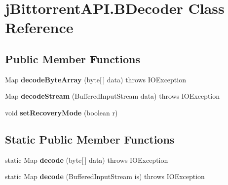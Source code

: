 \hypertarget{classj_bittorrent_a_p_i_1_1_b_decoder}{
\section{jBittorrentAPI.BDecoder Class Reference}
\label{classj_bittorrent_a_p_i_1_1_b_decoder}
}
\subsection*{Public Member Functions}
\begin{DoxyCompactItemize}
\item 
\hypertarget{classj_bittorrent_a_p_i_1_1_b_decoder_a43ad45b4ec9865baf539f3ae2704a5fe}{
Map {\bfseries decodeByteArray} (byte\mbox{[}$\,$\mbox{]} data)  throws IOException }
\label{classj_bittorrent_a_p_i_1_1_b_decoder_a43ad45b4ec9865baf539f3ae2704a5fe}

\item 
\hypertarget{classj_bittorrent_a_p_i_1_1_b_decoder_a1dbe8c6260cfef953eadc63c9b1dbdb6}{
Map {\bfseries decodeStream} (BufferedInputStream data)  throws IOException }
\label{classj_bittorrent_a_p_i_1_1_b_decoder_a1dbe8c6260cfef953eadc63c9b1dbdb6}

\item 
\hypertarget{classj_bittorrent_a_p_i_1_1_b_decoder_a1c0df0c7b9eeeee02ba20f9ea1ef5555}{
void {\bfseries setRecoveryMode} (boolean r)}
\label{classj_bittorrent_a_p_i_1_1_b_decoder_a1c0df0c7b9eeeee02ba20f9ea1ef5555}

\end{DoxyCompactItemize}
\subsection*{Static Public Member Functions}
\begin{DoxyCompactItemize}
\item 
\hypertarget{classj_bittorrent_a_p_i_1_1_b_decoder_af0d62cb698d43c52b83c13a78a0b406d}{
static Map {\bfseries decode} (byte\mbox{[}$\,$\mbox{]} data)  throws IOException }
\label{classj_bittorrent_a_p_i_1_1_b_decoder_af0d62cb698d43c52b83c13a78a0b406d}

\item 
\hypertarget{classj_bittorrent_a_p_i_1_1_b_decoder_abd2fa5ac89ff1789eabdf294c0cf2f0a}{
static Map {\bfseries decode} (BufferedInputStream is)  throws IOException }
\label{classj_bittorrent_a_p_i_1_1_b_decoder_abd2fa5ac89ff1789eabdf294c0cf2f0a}

\end{DoxyCompactItemize}


